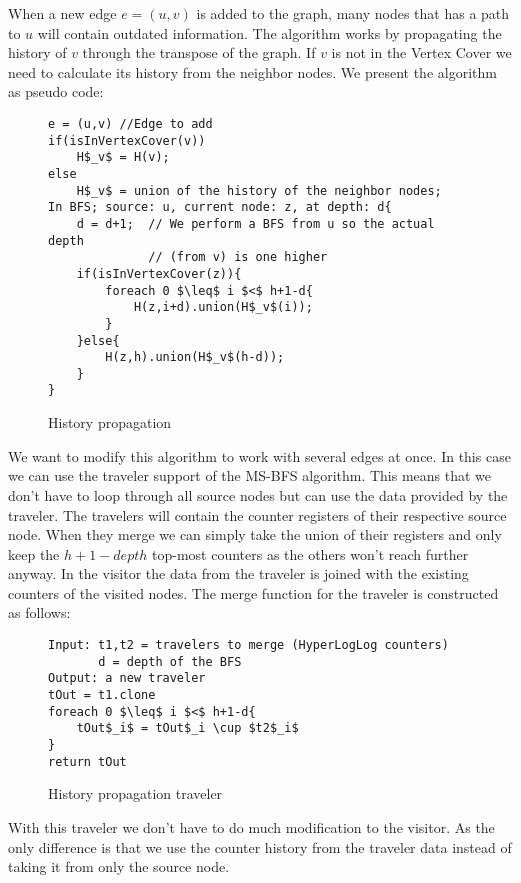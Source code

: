 When a new edge $e = (u,v)$ is added to the graph, many nodes that has a path to $u$ will contain outdated information. The algorithm works by propagating the history of $v$ through the transpose of the graph. If $v$ is not in the Vertex Cover we need to calculate its history from the neighbor nodes. We present the algorithm as pseudo code:

\begin{figure}[h]
    \begin{lstlisting}[mathescape]
e = (u,v) //Edge to add
if(isInVertexCover(v))
    H$_v$ = H(v);
else
    H$_v$ = union of the history of the neighbor nodes;
In BFS; source: u, current node: z, at depth: d{
    d = d+1;  // We perform a BFS from u so the actual depth 
              // (from v) is one higher
    if(isInVertexCover(z)){
        foreach 0 $\leq$ i $<$ h+1-d{
            H(z,i+d).union(H$_v$(i));
        }
    }else{
        H(z,h).union(H$_v$(h-d));
    }
}
    \end{lstlisting}
    \caption{History propagation}
    \label{fig:history_propagation_algorithm}
\end{figure}

We want to modify this algorithm to work with several edges at once. In this case we can use the traveler support of the MS-BFS algorithm. This means that we don't have to loop through all source nodes but can use the data provided by the traveler. The travelers will contain the counter registers of their respective source node. When they merge we can simply take the union of their registers and only keep the $h+1-depth$ top-most counters as the others won't reach further anyway. In the visitor the data from the traveler is joined with the existing counters of the visited nodes. The merge function for the traveler is constructed as follows:

\begin{figure}[h]
    \begin{lstlisting}[mathescape]
Input: t1,t2 = travelers to merge (HyperLogLog counters)
       d = depth of the BFS
Output: a new traveler
tOut = t1.clone
foreach 0 $\leq$ i $<$ h+1-d{
    tOut$_i$ = tOut$_i \cup $t2$_i$
}
return tOut
    \end{lstlisting}
    \caption{History propagation traveler}
    \label{fig:history_propagation_traveler}
\end{figure}

With this traveler we don't have to do much modification to the visitor. As the only difference is that we use the counter history from the traveler data instead of taking it from only the source node.\\

